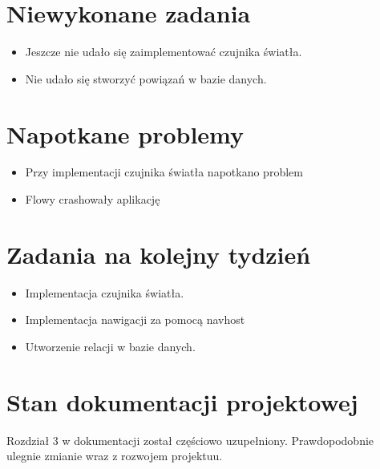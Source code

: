 \documentclass[12pt,a4paper]{mwart}
\begin{document}
\section{Niewykonane zadania}

\begin{itemize}
	\item Jeszcze nie udało się zaimplementować czujnika światła.
	
	\item Nie udało się stworzyć powiązań w bazie danych.
\end{itemize}

\section{Napotkane problemy}

\begin{itemize}
	\item Przy implementacji czujnika światła napotkano problem
	\item Flowy crashowały aplikację
\end{itemize}

\section{Zadania na kolejny tydzień}

\begin{itemize}
	\item Implementacja czujnika światła.
	
	\item Implementacja nawigacji za pomocą navhost
	
	\item Utworzenie relacji w bazie danych.
\end{itemize}

\section{Stan dokumentacji projektowej}

Rozdział 3 w dokumentacji został częściowo uzupełniony. Prawdopodobnie ulegnie zmianie wraz z rozwojem projektuu.
\end{document}
